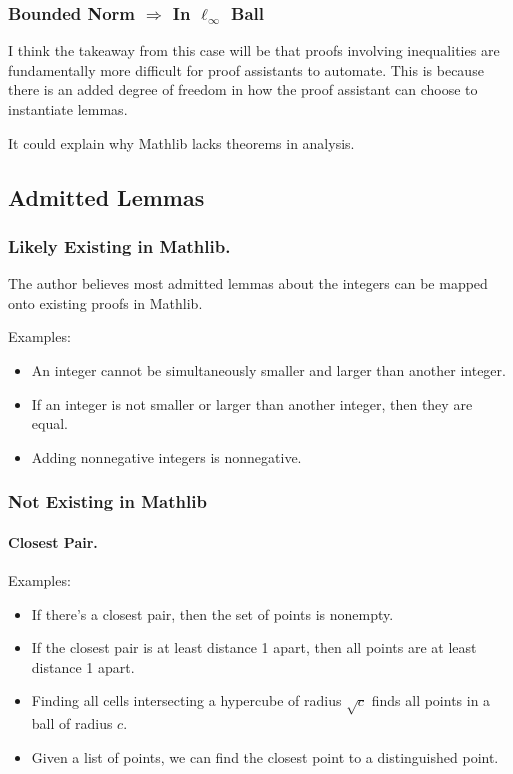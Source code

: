 \documentclass{article}
\begin{document}
\subsubsection{Bounded Norm $\Rightarrow$ In $\ell_\infty$ Ball}
I think the takeaway from this case will be that proofs involving inequalities are fundamentally more difficult for proof assistants to automate.
This is because there is an added degree of freedom in how the proof assistant can choose to instantiate lemmas.

It could explain why Mathlib lacks theorems in analysis.

\subsection{Admitted Lemmas}
\subsubsection{Likely Existing in Mathlib.}
The author believes most admitted lemmas about the integers can be mapped onto existing proofs in Mathlib.

Examples:
\begin{itemize}
  \item An integer cannot be simultaneously smaller and larger than another integer.
  \item If an integer is not smaller or larger than another integer, then they are equal.
  \item Adding nonnegative integers is nonnegative.
\end{itemize}

\subsubsection{Not Existing in Mathlib}
\paragraph{Closest Pair.}
Examples:
\begin{itemize}
  \item If there's a closest pair, then the set of points is nonempty.
  \item If the closest pair is at least distance 1 apart, then all points are at least distance 1 apart.
  \item Finding all cells intersecting a hypercube of radius $\sqrt{c}$ finds all points in a ball of radius $c$.
  \item Given a list of points, we can find the closest point to a distinguished point.
\end{itemize}
\end{document}
